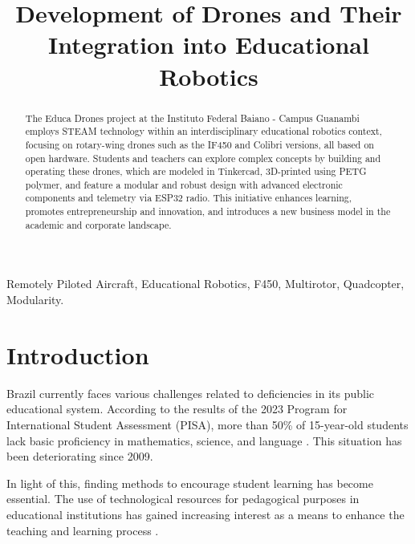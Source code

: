 \documentclass[conference]{IEEEtran}
\begin{document}
\title{Development of Drones and Their Integration into Educational Robotics}


\maketitle

\begin{abstract}
The Educa Drones project at the Instituto Federal Baiano - Campus Guanambi employs STEAM technology within an interdisciplinary educational robotics context, focusing on rotary-wing drones such as the IF450 and Colibri versions, all based on open hardware. Students and teachers can explore complex concepts by building and operating these drones, which are modeled in Tinkercad, 3D-printed using PETG polymer, and feature a modular and robust design with advanced electronic components and telemetry via ESP32 radio. This initiative enhances learning, promotes entrepreneurship and innovation, and introduces a new business model in the academic and corporate landscape.
\end{abstract}

\begin{IEEEkeywords}
Remotely Piloted Aircraft, Educational Robotics, F450, Multirotor, Quadcopter, Modularity.
\end{IEEEkeywords}

\section{Introduction}

Brazil currently faces various challenges related to deficiencies in its public educational system. According to the results of the 2023 Program for International Student Assessment (PISA), more than 50\% of 15-year-old students lack basic proficiency in mathematics, science, and language \cite{b6}. This situation has been deteriorating since 2009.

In light of this, finding methods to encourage student learning has become essential. The use of technological resources for pedagogical purposes in educational institutions has gained increasing interest as a means to enhance the teaching and learning process \cite{b12}.
\end{document}
